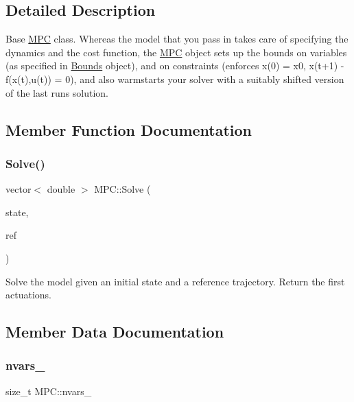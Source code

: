 \subsection{Detailed Description}
Base \mbox{\hyperlink{classMPC}{M\+PC}} class. Whereas the model that you pass in takes care of specifying the dynamics and the cost function, the \mbox{\hyperlink{classMPC}{M\+PC}} object sets up the bounds on variables (as specified in \mbox{\hyperlink{structBounds}{Bounds}} object), and on constraints (enforces x(0) = x0, x(t+1) -\/ f(x(t),u(t)) = 0), and also warmstarts your solver with a suitably shifted version of the last run\textquotesingle{}s solution. 

\subsection{Member Function Documentation}
\mbox{\label{classMPC_ae07d02edbf31f94d738cfa206e5b2d77}} 
\subsubsection{\texorpdfstring{Solve()}{Solve()}}
{\footnotesize\ttfamily vector$<$ double $>$ M\+P\+C\+::\+Solve (\begin{DoxyParamCaption}\item[{const Vector\+Xd \&}]{state,  }\item[{const Vector\+Xd \&}]{ref }\end{DoxyParamCaption})\hspace{0.3cm}{\ttfamily [virtual]}}

Solve the model given an initial state and a reference trajectory. Return the first actuations. 

\subsection{Member Data Documentation}
\mbox{\label{classMPC_a9a9db53c26d46e7579d02a5d08c0358c}} 
\subsubsection{\texorpdfstring{nvars\+\_\+}{nvars\_}}
{\footnotesize\ttfamily size\+\_\+t M\+P\+C\+::nvars\+\_\+\hspace{0.3cm}{\ttfamily [protected]}}

